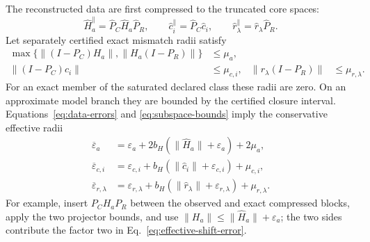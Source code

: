 \documentclass[aps,prl,onecolumn,superscriptaddress,nofootinbib]{revtex4-2}
\newcommand{\eps}{\varepsilon}
\begin{document}
The reconstructed data are first compressed to the truncated core spaces:
\begin{equation}
 \widehat H_a^{\parallel}=\widehat P_C\widehat H_a\widehat P_R,
 \qquad
 \widehat c_i^{\parallel}=\widehat P_C\widehat c_i,
 \qquad
 \widehat r_\lambda^{\parallel}=\widehat r_\lambda\widehat P_R.
 \label{eq:compressed-data}
\end{equation}
Let separately certified exact mismatch radii satisfy
\begin{align}
 \max\{\|(I-P_C)H_a\|,\|H_a(I-P_R)\|\}&\le\mu_a,\nonumber\\
 \|(I-P_C)c_i\|&\le\mu_{c,i},&
 \|r_\lambda(I-P_R)\|&\le\mu_{r,\lambda}.
 \label{eq:model-mismatch-radii}
\end{align}
For an exact member of the saturated declared class these radii are zero.  On an approximate model branch they are bounded by the certified closure interval.  Equations~\eqref{eq:data-errors} and \eqref{eq:subspace-bounds} imply the conservative effective radii
\begin{align}
 \overline\eps_a
 &=\eps_a+2b_H(\|\widehat H_a\|+\eps_a)+2\mu_a,
 \label{eq:effective-shift-error}\\
 \overline\eps_{c,i}
 &=\eps_{c,i}+b_H(\|\widehat c_i\|+\eps_{c,i})+\mu_{c,i},
 \label{eq:effective-seed-error}\\
 \overline\eps_{r,\lambda}
 &=\eps_{r,\lambda}+b_H(\|\widehat r_\lambda\|+\eps_{r,\lambda})+\mu_{r,\lambda}.
 \label{eq:effective-readout-error}
\end{align}
For example, insert $P_CH_aP_R$ between the observed and exact compressed blocks, apply the two projector bounds, and use
$\|H_a\|\le\|\widehat H_a\|+\eps_a$; the two sides contribute the factor two in Eq.~\eqref{eq:effective-shift-error}.
\end{document}
